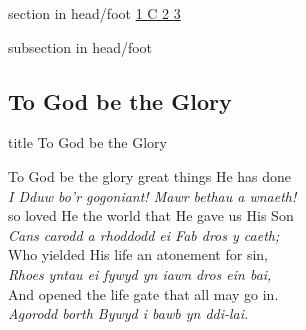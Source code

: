 \documentclass[aspectratio=169]{beamer}
\newcommand{\Eng}[1]{\textcolor{Eng}{\textsf{#1}}}
\newcommand{\Cym}[1]{\textcolor{Cym}{\textit{#1}}}
\begin{document}
{
{ 
 {
 \begin{beamercolorbox}[ht=4.5ex,dp=1.5ex,%
      leftskip=.3cm,rightskip=.3cm plus1fil]{section in head/foot}
 \fontsize{12}{25}\selectfont 
\hyperlink{To God be the Glory[]1}{1  }\hyperlink{To God be the Glory[]C}{C  }\hyperlink{To God be the Glory[]2}{2  }\hyperlink{To God be the Glory[]3}{3  } 
 \end{beamercolorbox}%
  \begin{beamercolorbox}[ht=2.5ex,dp=1.125ex,%
   leftskip=.3cm,rightskip=.3cm plus1fil]{subsection in head/foot}
   \insertauthor
 \end{beamercolorbox}%
 }
}
\subsection{To God be the Glory}
\hypertarget{To God be the Glory[]}{}
\begin{frame}{}
 \vfill
  \centering
  \begin{beamercolorbox}[sep=8pt,center,shadow=true,rounded=true]{title}
    To God be the Glory     
  \end{beamercolorbox}
  \vfill
\end{frame}

\hypertarget{To God be the Glory[]1}{}
\begin{frame}{}
\fontsize{14.285714285714286}{17.142857142857142}\selectfont

\Eng{To God be the glory great things He has done}\\ 
\Cym{I Dduw bo’r gogoniant! Mawr bethau a wnaeth!}\\ 
\Eng{so loved He the world that He gave us His Son}\\ 
\Cym{Cans carodd a rhoddodd ei Fab dros y caeth;}\\ 
\Eng{Who yielded His life an atonement for sin,}\\ 
\Cym{Rhoes yntau ei fywyd yn iawn dros ein bai,}\\ 
\Eng{And opened the life gate that all may go in.}\\ 
\Cym{Agorodd borth Bywyd i bawb yn ddi-lai.}

\end{frame}
\hypertarget{To God be the Glory[]C}{}
\begin{frame}{}
\fontsize{14.285714285714286}{17.142857142857142}\selectfont


\end{frame}}
\end{document}

